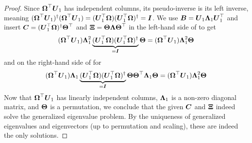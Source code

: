 \begin{proof}
    Since $\boldsymbol{\Omega}^{\top} \boldsymbol{U}_1$ has independent columns, its pseudo-inverse
    is its left inverse, meaning 
    $(\boldsymbol{\Omega}^{\top} \boldsymbol{U}_1)^{\dagger} (\boldsymbol{\Omega}^{\top} \boldsymbol{U}_1) = ( \boldsymbol{U}_1^{\top}\boldsymbol{\Omega}) ( \boldsymbol{U}_1^{\top}\boldsymbol{\Omega})^{\dagger} = \boldsymbol{I}$.
    We use $\boldsymbol{B} = \boldsymbol{U}_1 \boldsymbol{\Lambda}_1 \boldsymbol{U}_1^{\top}$ and insert
    $\boldsymbol{C} = (\boldsymbol{U}_1^{\top} \boldsymbol{\Omega})^{\dagger} \boldsymbol{\Theta}^{\top}$
    and $\boldsymbol{\Xi} = \boldsymbol{\Theta} \boldsymbol{\Lambda} \boldsymbol{\Theta}^{\top}$ in the
    left-hand side of  to get
    \begin{equation}
        (\boldsymbol{\Omega}^{\top} \boldsymbol{U}_1) \boldsymbol{\Lambda}_1^2 \underbrace{(\boldsymbol{U}_1^{\top} \boldsymbol{\Omega}) (\boldsymbol{U}_1^{\top} \boldsymbol{\Omega})^{\dagger}}_{=\boldsymbol{I}} \boldsymbol{\Theta} = (\boldsymbol{\Omega}^{\top} \boldsymbol{U}_1) \boldsymbol{\Lambda}_1^2 \boldsymbol{\Theta}
    \end{equation}
    and on the right-hand side of  for
    \begin{equation}
        (\boldsymbol{\Omega}^{\top} \boldsymbol{U}_1) \boldsymbol{\Lambda}_1 \underbrace{(\boldsymbol{U}_1^{\top} \boldsymbol{\Omega}) (\boldsymbol{U}_1^{\top} \boldsymbol{\Omega})^{\dagger}}_{=\boldsymbol{I}} \boldsymbol{\Theta} \boldsymbol{\Theta}^{\top} \boldsymbol{\Lambda}_1 \boldsymbol{\Theta} = (\boldsymbol{\Omega}^{\top} \boldsymbol{U}_1) \boldsymbol{\Lambda}_1^2 \boldsymbol{\Theta}
    \end{equation}
    Now that $\boldsymbol{\Omega}^{\top} \boldsymbol{U}_1$ has linearly independent columns, $\boldsymbol{\Lambda}_1$ is a non-zero
    diagonal matrix, and $\boldsymbol{\Theta}$ is a permutation, we conclude that
    the given $\boldsymbol{C}$ and $\boldsymbol{\Xi}$ indeed solve the generalized eigenvalue problem.
    By the uniqueness of generalized eigenvalues and eigenvectors (up to
    permutation and scaling), these are indeed the only solutions.


\end{proof}
